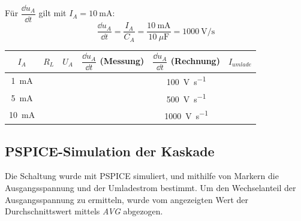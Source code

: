 \documentclass[
12pt,
a4paper,
headings=small,                    %
bibliography=totoc,                %
listof=totoc,                      %
parskip=half*,                     %
]{scrartcl}                        %
\renewcommand{\arraystretch}{1.15}
\newcommand{\laborsubsection}[2] {
    \renewcommand{\thesubsection}{#1 \thesection.\arabic{subsection}}
    \subsection{#2}
    \renewcommand{\thesubsection}{\thesection.\arabic{subsection}}
}
\newcommand{\resetlaborsectioncounter}{\setcounter{subsection}{0}}
\begin{document}
Für $\dfrac{\dd{u_A}}{\dd{t}}$ gilt mit $I_A = \SI{10}{\milli\ampere}$:
\begin{equation}
    \dfrac{\dd{u_A}}{\dd{t}} = \dfrac{I_A}{C_A} = \dfrac{\SI{10}{\milli\ampere}}{\SI{10}{\mu\farad}} = \SI{1000}{\volt\per\second}
\end{equation}

\begin{table}[H]
    \centering
    \renewcommand{\arraystretch}{2} %
    \setlength{\tabcolsep}{1.3em} %
    \begin{tabular}{|c|c|c|c|c|c|}
        \hline
        $I_A$                  & $R_L $ & $U_A$ & $\dfrac{\dd{u_A}}{\dd{t}}$ (Messung) & $\dfrac{\dd{u_A}}{\dd{t}}$ (Rechnung) & $I_{umlade}$ \\ \hline
        \SI{1}{\milli\ampere}  &        &       &                                      & \SI{100}{\volt\per\second}            &              \\ \hline
        \SI{5}{\milli\ampere}  &        &       &                                      & \SI{500}{\volt\per\second}            &              \\ \hline
        \SI{10}{\milli\ampere} &        &       &                                      & \SI{1000}{\volt\per\second}           &              \\ \hline
    \end{tabular}
\end{table}

\resetlaborsectioncounter
\laborsubsection{D}{PSPICE-Simulation der Kaskade}
Die Schaltung wurde mit PSPICE simuliert, und mithilfe von Markern die Ausgangsspannung und der Umladestrom bestimmt. Um den Wechselanteil der Ausgangsspannung zu ermitteln, wurde vom angezeigten Wert der Durchschnittswert mittels \textit{AVG} abgezogen.
\end{document}
